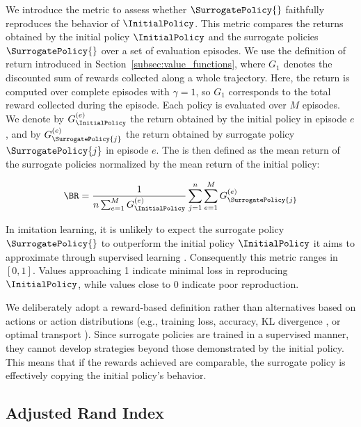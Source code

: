 We introduce the \BehaviorReconstructionName metric to assess whether $\SurrogatePolicy{}$ faithfully reproduces the behavior of $\InitialPolicy$.
This metric compares the returns obtained by the initial policy $\InitialPolicy$ and the surrogate policies $\SurrogatePolicy{}$ over a set of evaluation episodes.
We use the definition of return introduced in Section~\ref{subsec:value_functions}, where $G_1$ denotes the discounted sum of rewards collected along a whole trajectory.
Here, the return is computed over complete episodes with $\gamma=1$, so $G_1$ corresponds to the total reward collected during the episode.
Each policy is evaluated over $M$ episodes.
We denote by $G^{(e)}_{\InitialPolicy}$ the return obtained by the initial policy in episode $e$, and by $G^{(e)}_{\SurrogatePolicy{j}}$ the return obtained by surrogate policy $\SurrogatePolicy{j}$ in episode $e$.
The \BehaviorReconstructionName{} is then defined as the mean return of the surrogate policies normalized by the mean return of the initial policy:

\begin{align}
    \BR = \frac{1}{n \sum_{e=1}^{M} G^{(e)}_{\InitialPolicy}} \sum_{j=1}^{n} \sum_{e=1}^{M} G^{(e)}_{\SurrogatePolicy{j}}
\end{align}

In imitation learning, it is unlikely to expect the surrogate policy $\SurrogatePolicy{}$ to outperform the initial policy $\InitialPolicy$ it aims to approximate through supervised learning \parencite{pmlr-v9-ross10a}.
Consequently this metric ranges in $[0,1]$.
Values approaching 1 indicate minimal loss in reproducing $\InitialPolicy$, while values close to 0 indicate poor reproduction.  

We deliberately adopt a reward-based definition rather than alternatives based on actions or action distributions (e.g., training loss, accuracy, KL divergence \parencite{shlens2014noteskullbackleiblerdivergencelikelihood}, or optimal transport \parencite{peyré2020computationaloptimaltransport}).
Since surrogate policies are trained in a supervised manner, they cannot develop strategies beyond those demonstrated by the initial policy.
This means that if the rewards achieved are comparable, the surrogate policy is effectively copying the initial policy's behavior.

\subsection{Adjusted Rand Index}
\label{subsec:adjusted_rand_index}

